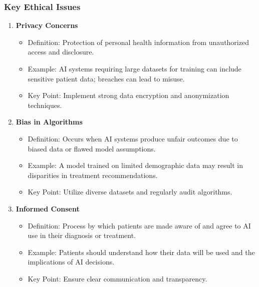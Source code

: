 \documentclass[aspectratio=169]{beamer}
\begin{document}
\begin{frame}[fragile]
    \frametitle{Key Ethical Issues}
    \begin{enumerate}
        \item \textbf{Privacy Concerns}
        \begin{itemize}
            \item Definition: Protection of personal health information from unauthorized access and disclosure.
            \item Example: AI systems requiring large datasets for training can include sensitive patient data; breaches can lead to misuse.
            \item Key Point: Implement strong data encryption and anonymization techniques.
        \end{itemize}
        
        \item \textbf{Bias in Algorithms}
        \begin{itemize}
            \item Definition: Occurs when AI systems produce unfair outcomes due to biased data or flawed model assumptions.
            \item Example: A model trained on limited demographic data may result in disparities in treatment recommendations.
            \item Key Point: Utilize diverse datasets and regularly audit algorithms.
        \end{itemize}
        
        \item \textbf{Informed Consent}
        \begin{itemize}
            \item Definition: Process by which patients are made aware of and agree to AI use in their diagnosis or treatment.
            \item Example: Patients should understand how their data will be used and the implications of AI decisions.
            \item Key Point: Ensure clear communication and transparency.
        \end{itemize}
    \end{enumerate}
\end{frame}
\end{document}
